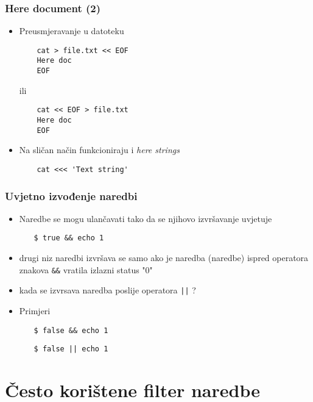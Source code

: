 \documentclass{beamer}
\newcommand{\shell}[1]{\texttt{#1}}
\begin{document}
\begin{frame}[fragile]
\frametitle{Here document (2)}
\begin{itemize}
	\item Preusmjeravanje u datoteku
	\item[] \begin{verbatim}
	cat > file.txt << EOF
	Here doc
	EOF
	\end{verbatim}
	\item[ili] \begin{verbatim}
	cat << EOF > file.txt
	Here doc
	EOF
	\end{verbatim}
\end{itemize}
\begin{itemize}
	\item Na sličan način funkcioniraju i \textit{here strings}
	\item[] \begin{verbatim}
	cat <<< 'Text string'
	\end{verbatim}
\end{itemize}
\end{frame}

\begin{frame}[t]
\frametitle{Uvjetno izvođenje naredbi}
\begin{itemize}
  \item Naredbe se mogu ulančavati tako da se njihovo izvršavanje uvjetuje
  \begin{itemize}
    \item[] \shell{\$ true \&\& echo 1}
  \end{itemize}
  \item drugi niz naredbi izvršava se samo ako je naredba (naredbe) ispred
        operatora znakova \shell{\&\&} vratila izlazni status "0"
  \item kada se izvrsava naredba poslije operatora \shell{||}  ?
  \item Primjeri
  \begin{itemize}
    \item[] \shell{\$ false \&\& echo 1}
    \item[] \shell{\$ false || echo 1}
    
  \end{itemize}
\end{itemize}
\end{frame}

\section{Često korištene filter naredbe}
\end{document}
